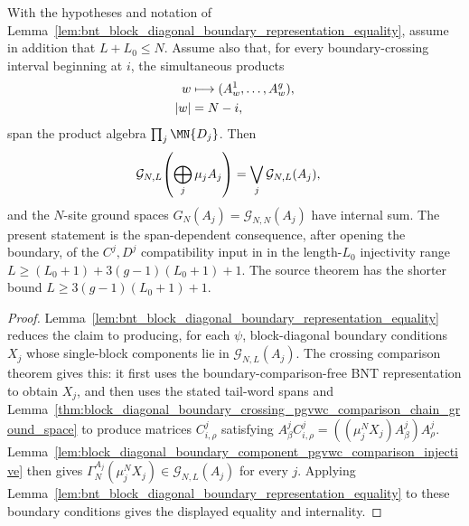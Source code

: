 \begin{lemma}
    \label{lem:bnt_block_diagonal_crossing_pgvwc_comparison_equality}
    \leanok
    With the hypotheses and notation of
    Lemma~\ref{lem:bnt_block_diagonal_boundary_representation_equality}, assume
    in addition that $L+L_0\le N$. Assume also that, for every
    boundary-crossing interval beginning at $i$, the simultaneous products
    \begin{align}
        w   & \longmapsto (A^1_w,\ldots,A^g_w),
        \notag                                  \\
        |w| & = N-i,
        \notag
    \end{align}
    span the product algebra $\prod_j\MN{D_j}$. Then
    \begin{align}
        \mathcal G_{N,L}\!\left(\bigoplus_j\mu_jA_j\right)
         & =
        \bigvee_j\mathcal G_{N,L}(A_j),
        \notag
    \end{align}
    and the $N$-site ground spaces $G_N(A_j)=\mathcal G_{N,N}(A_j)$
    have internal sum.
    The present statement is the span-dependent consequence, after opening the
    boundary, of the $C^j,D^j$ compatibility input in
    \cite[Theorem~12, proof lines~1436--1451]{PerezGarcia2007Matrix} in the
    length-$L_0$ injectivity range
    $L \ge (L_0+1)+3(g-1)(L_0+1)+1$.
    The source theorem has the shorter bound
    $L \ge 3(g-1)(L_0+1)+1$.
\end{lemma}

\begin{proof}
    \leanok
    Lemma~\ref{lem:bnt_block_diagonal_boundary_representation_equality} reduces
    the claim to producing, for each $\psi$, block-diagonal boundary conditions
    $X_j$ whose single-block components lie in
    $\mathcal G_{N,L}(A_j)$. The crossing comparison theorem gives this:
    it first uses the boundary-comparison-free BNT representation to obtain
    $X_j$, and then uses the stated tail-word spans and
    Lemma~\ref{thm:block_diagonal_boundary_crossing_pgvwc_comparison_chain_ground_space}
    to produce matrices $C^j_{i,\rho}$ satisfying
    $A^j_\beta C^j_{i,\rho} = ((\mu_j^N X_j)A^j_\beta)A^j_\rho$.
    Lemma~\ref{lem:block_diagonal_boundary_component_pgvwc_comparison_injective}
    then gives
    $\Gamma_N^{A_j}(\mu_j^N X_j)\in\mathcal G_{N,L}(A_j)$
    for every $j$. Applying
    Lemma~\ref{lem:bnt_block_diagonal_boundary_representation_equality} to these
    boundary conditions gives the displayed equality and internality.
\end{proof}


